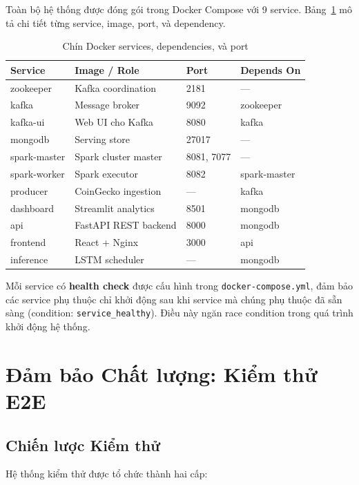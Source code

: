 \documentclass[12pt, a4paper]{article}
\begin{document}
Toàn bộ hệ thống được đóng gói trong Docker Compose với 9 service.
Bảng~\ref{tab:docker_services} mô tả chi tiết từng service, image, port, và
dependency.

\begin{table}[H]
  \centering
  \caption{Chín Docker services, dependencies, và port}
  \label{tab:docker_services}
  \begin{tabularx}{\textwidth}{lXll}
    \toprule
    Service & Image / Role & Port & Depends On \\
    \midrule
    zookeeper & Kafka coordination & 2181 & --- \\
    kafka & Message broker & 9092 & zookeeper \\
    kafka-ui & Web UI cho Kafka & 8080 & kafka \\
    mongodb & Serving store & 27017 & --- \\
    spark-master & Spark cluster master & 8081, 7077 & --- \\
    spark-worker & Spark executor & 8082 & spark-master \\
    producer & CoinGecko ingestion & --- & kafka \\
    dashboard & Streamlit analytics & 8501 & mongodb \\
    api & FastAPI REST backend & 8000 & mongodb \\
    frontend & React + Nginx & 3000 & api \\
    inference & LSTM scheduler & --- & mongodb \\
    \bottomrule
  \end{tabularx}
\end{table}

Mỗi service có \textbf{health check} được cấu hình trong \texttt{docker-compose.yml},
đảm bảo các service phụ thuộc chỉ khởi động sau khi service mà chúng phụ thuộc đã
sẵn sàng (condition: \texttt{service\_healthy}). Điều này ngăn race condition trong
quá trình khởi động hệ thống.

\section{Đảm bảo Chất lượng: Kiểm thử E2E}

\subsection{Chiến lược Kiểm thử}

Hệ thống kiểm thử được tổ chức thành hai cấp:
\end{document}
